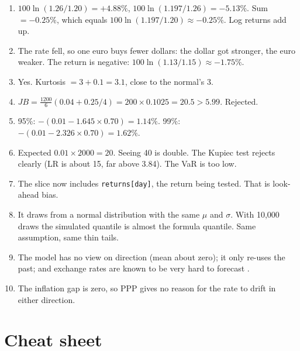 \documentclass[11pt,a4paper]{article}
\newcommand{\code}[1]{\texttt{#1}}
\begin{document}
\begin{enumerate}[label=\textbf{\arabic*.}]
  \item $100\ln(1.26/1.20) = +4.88\%$, $100\ln(1.197/1.26) = -5.13\%$. Sum
    $= -0.25\%$, which equals $100\ln(1.197/1.20) \approx -0.25\%$. Log
    returns add up.
  \item The rate fell, so one euro buys fewer dollars: the dollar got
    stronger, the euro weaker. The return is negative:
    $100\ln(1.13/1.15) \approx -1.75\%$.
  \item Yes. Kurtosis $= 3 + 0.1 = 3.1$, close to the normal's 3.
  \item $JB = \frac{1200}{6}(0.04 + 0.25/4) = 200 \times 0.1025 = 20.5 >
    5.99$. Rejected.
  \item 95\%: $-(0.01 - 1.645 \times 0.70) = 1.14\%$.
    99\%: $-(0.01 - 2.326 \times 0.70) = 1.62\%$.
  \item Expected $0.01 \times 2000 = 20$. Seeing 40 is double. The Kupiec
    test rejects clearly (LR is about 15, far above 3.84). The VaR is too
    low.
  \item The slice now includes \code{returns[day]}, the return being
    tested. That is look-ahead bias.
  \item It draws from a normal distribution with the same $\mu$ and
    $\sigma$. With 10{,}000 draws the simulated quantile is almost the
    formula quantile. Same assumption, same thin tails.
  \item The model has no view on direction (mean about zero); it only
    re-uses the past; and exchange rates are known to be very hard to
    forecast \citep{meese1983,rossi2013}.
  \item The inflation gap is zero, so PPP gives no reason for the rate to
    drift in either direction.
\end{enumerate}

\newpage
\section{Cheat sheet}\label{sec:cheat}
\end{document}
